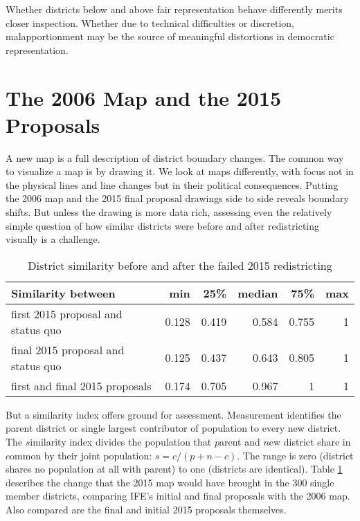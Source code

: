 \documentclass[letter,12pt]{article}
\begin{document}
Whether districts below and above fair representation behave differently merits closer inspection. Whether due to technical difficulties or discretion, malapportionment may be the source of meaningful distortions in democratic representation.

\section{The 2006 Map and the 2015 Proposals}


A new map is a full description of district boundary changes. The common way to visualize a map is by drawing it. We look at maps differently, with focus not in the physical lines and line changes but in their political consequences. Putting the 2006 map and the 2015 final proposal drawings side to side reveals boundary shifts. But unless the drawing is more data rich, assessing even the relatively simple question of how similar districts were before and after redistricting visually is a challenge. 

\begin{table}
\begin{center}
  \begin{tabular}{lrrrrr}
  Similarity between                 &   min  &  25\%  & median &  75\% &  max \\ \hline
  first 2015 proposal and status quo & 0.128  & 0.419  & 0.584  & 0.755 &  1   \\
  final 2015 proposal and status quo & 0.125  & 0.437  & 0.643  & 0.805 &  1   \\
  first and final 2015 proposals     & 0.174  & 0.705  & 0.967  & 1     &  1   \\
  \end{tabular}
  \caption{District similarity before and after the failed 2015 redistricting}\label{T:simIndex}
\end{center}
\end{table}

But a similarity index \citep[][:15--7]{cox.katz.2002} offers ground for assessment. Measurement identifies the parent district or single largest contributor of population to every new district. The $s$imilarity index divides the population that $p$arent and $n$ew district share in $c$ommon by their joint population: $s = c / (p + n - c)$. The range is zero (district shares no population at all with parent) to one (districts are identical). Table \ref{T:simIndex} describes the change that the 2015 map would have brought in the 300 single member districts, comparing IFE's initial and final proposals with the 2006 map. Also compared are the final and initial 2015 proposals themselves. 
\end{document}

